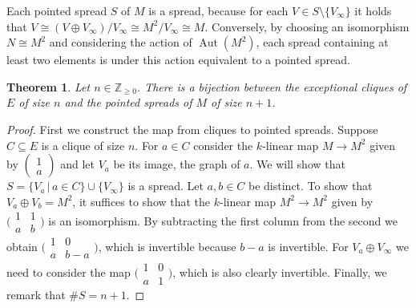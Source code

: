 \documentclass{amsart}
\theoremstyle{plain}
\newtheorem{theorem}{Theorem}[section]
\theoremstyle{definition}
\DeclareMathOperator{\Aut}{Aut}
\newcommand{\Z}{\ensuremath{\mathbb{Z}}}
\newcommand{\clq}{C}
\begin{document}
Each pointed spread \(S\) of \(M\) is a spread, because for each \(V\in S\setminus \{V_\infty\}\) it holds that \(V \cong (V \oplus V_\infty)/V_\infty \cong M^2/V_\infty \cong M\).
Conversely, by choosing an isomorphism \(N\cong M^2\) and considering the action of \(\Aut(M^2)\), each spread containing at least two elements is under this action equivalent to a pointed spread.

\begin{theorem}\label{thm:clique_spread}
	Let \(n\in\Z_{\geq0}\).
	There is a bijection between the exceptional cliques of \(E\) of size \(n\) and the pointed spreads of \(M\) of size \(n+1\).
\end{theorem}
\begin{proof}
	First we construct the map from cliques to pointed spreads.
	Suppose \(\clq\subseteq E\) is a clique of size \(n\).
	For \(a\in \clq\) consider the \(k\)-linear map \(M\to M^2\) given by \(\left(\begin{smallmatrix}1 \\ a\end{smallmatrix}\right)\) and let \(V_a\) be its image, the graph of \(a\).
	We will show that \(S=\{V_a\,|\, a\in \clq\}\cup\{V_\infty\}\) is a spread.
	Let \(a,b\in \clq\) be distinct. 
	To show that \(V_a \oplus V_b = M^2\), it suffices to show that the \(k\)-linear map \(M^2\to M^2\)  given by \(\big(\begin{smallmatrix} 1 & 1 \\ a & b \end{smallmatrix}\big)\) is an isomorphism.
	By subtracting the first column from the second we obtain \(\big(\begin{smallmatrix} 1 & 0 \\ a & b-a \end{smallmatrix}\big)\), which is invertible because \(b-a\) is invertible. For \(V_a\oplus V_\infty\) we need to consider the map \(\big(\begin{smallmatrix} 1 & 0 \\ a & 1 \end{smallmatrix}\big)\), which is also clearly invertible.
	Finally, we remark that \(\#S=n+1\).
	

\end{proof}
\end{document}
